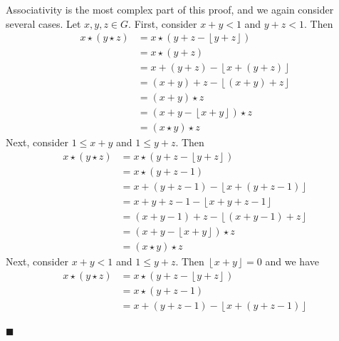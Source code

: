 \documentclass[12pt]{article}
\renewcommand{\qed}{\hfill$\blacksquare$}
\renewenvironment{proof}{\begin{addmargin}[1em]{0em}\begin{newproof}}{\end{newproof}\end{addmargin}\qed}
\begin{document}
\begin{proof}
Associativity is the most complex part of this proof, and we again consider several cases. Let $x,y,z \in G$. First, consider $x+y<1$ and $y+z<1$. Then
\begin{equation*}
    \begin{split}
        x\star \left(y\star z\right) & = x \star \left(y+z-\left\lfloor y+z\right\rfloor \right) \\
        & = x\star \left(y+z\right) \\
        & = x + \left(y+z\right) - \left\lfloor x + \left(y+z\right)\right\rfloor \\
        & = \left(x+y\right) + z - \left\lfloor \left(x+y\right) +z \right\rfloor \\
        & = \left(x+y\right)\star z \\
        & = \left(x+y -\left\lfloor x+y \right\rfloor\right)\star z \\
        & = \left(x\star y\right)\star z
    \end{split}
\end{equation*}
Next, consider $1\leq x+y$ and $1\leq y+z$. Then
\begin{equation*}
    \begin{split}
        x\star \left(y\star z\right) & = x\star \left(y + z- \left\lfloor y+z\right\rfloor \right) \\
        & = x\star \left(y+z-1\right) \\
        & = x+\left(y+z-1\right) -\left\lfloor x+\left(y+z-1\right)\right\rfloor \\
        & = x+y+z-1 - \left\lfloor x + y +z -1 \right\rfloor \\
        & = \left(x+y -1\right) + z - \left\lfloor \left(x+y-1\right)+z\right\rfloor \\
        & = \left(x+y-\left\lfloor x+y\right\rfloor \right) \star z \\
        & = \left(x\star y\right)\star z
    \end{split}
\end{equation*}
Next, consider $x+y<1$ and $1\leq y+z$. Then $\left\lfloor x+y\right\rfloor = 0$ and we have
\begin{equation*}
    \begin{split}
        x\star \left(y\star z\right) &= x\star \left(y+z-\left\lfloor y+z\right\rfloor \right) \\
        & = x\star\left(y+z-1\right) \\
        & = x+\left(y+z-1\right) - \left\lfloor x+\left(y+z-1\right)\right\rfloor \\

\end{split}
\end{equation*}
\end{proof}
\end{document}
